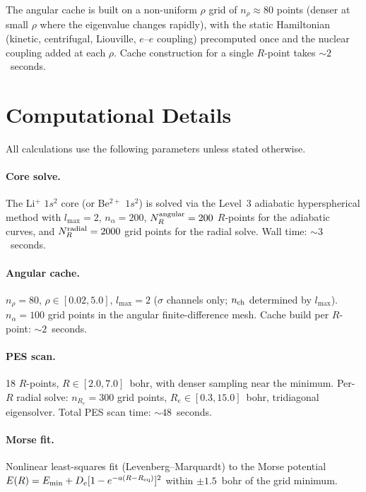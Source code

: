 \documentclass[aps,pra,twocolumn,superscriptaddress,longbibliography,floatfix]{revtex4-2}
\begin{document}
The angular cache is built on a non-uniform $\rho$ grid of
$n_\rho \approx 80$ points (denser at small $\rho$ where the
eigenvalue changes rapidly), with the static Hamiltonian (kinetic,
centrifugal, Liouville, $e$--$e$ coupling) precomputed once and the
nuclear coupling added at each $\rho$.  Cache construction for a
single $R$-point takes ${\sim}2$~seconds.


\section{Computational Details}
\label{sec:details}

All calculations use the following parameters unless stated otherwise.

\paragraph{Core solve.}
The Li$^+$ $1s^2$ core (or Be$^{2+}$ $1s^2$) is solved via the
Level~3 adiabatic hyperspherical method with
$l_{\max} = 2$, $n_\alpha = 200$, $N_{R}^{\rm angular} = 200$
$R$-points for the adiabatic curves, and
$N_{R}^{\rm radial} = 2000$ grid points for the radial solve.
Wall time: ${\sim}3$~seconds.

\paragraph{Angular cache.}
$n_\rho = 80$, $\rho \in [0.02, 5.0]$, $l_{\max} = 2$
($\sigma$ channels only; $n_{\rm ch}$ determined by $l_{\max}$).
$n_\alpha = 100$ grid points in the angular finite-difference mesh.
Cache build per $R$-point: ${\sim}2$~seconds.

\paragraph{PES scan.}
18 $R$-points, $R \in [2.0, 7.0]$~bohr, with denser sampling near
the minimum.  Per-$R$ radial solve: $n_{R_e} = 300$ grid points,
$R_e \in [0.3, 15.0]$~bohr, tridiagonal eigensolver.
Total PES scan time: ${\sim}48$~seconds.

\paragraph{Morse fit.}
Nonlinear least-squares fit (Levenberg--Marquardt) to the Morse
potential $E(R) = E_{\min} + D_e[1 - e^{-a(R-R_{\rm eq})}]^2$
within $\pm 1.5$~bohr of the grid minimum.
\end{document}
